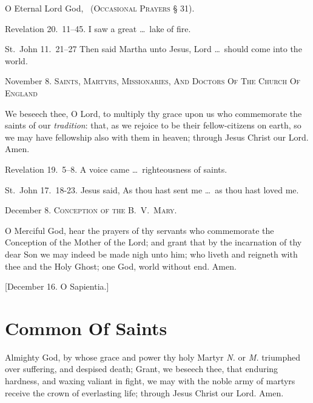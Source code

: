 O Eternal Lord God, \etc\ ({\scshape Occasional Prayers} § 31).

 Revelation 20.~11–45.   I saw a great \ldots\ lake of fire.

 St.~John 11.~21–27   Then said Martha unto Jesus, Lord \ldots\ should come into the world.



 
\medskip

\noindent November 8. {\scshape Saints, Martyrs, Missionaries, And Doctors Of The Church Of England}

 We beseech thee, O Lord, to multiply thy grace upon us who commemorate the saints of our \emph{tradition}: that, as we rejoice to be their fellow-citizens on earth, so we may have fellowship also with them in heaven; through Jesus Christ our Lord. \R Amen.

 Revelation 19.~5–8.   A voice came \ldots\ righteousness of saints.

 St.~John 17.~18-23.   Jesus said, As thou hast sent me \ldots\ as thou hast loved me.

\medskip

\noindent December 8. {\scshape Conception of the B.~V.~Mary.}

 O Merciful God, hear the prayers of thy servants who commemorate the Conception of the Mother of the Lord; and grant that by the incarnation of thy dear Son we may indeed be made nigh unto him; who liveth and reigneth with thee and the Holy Ghost; one God, world without end. Amen.

\medskip

[December 16. O Sapientia.]


 

\section{Common Of Saints}


 Almighty God, by whose grace and power thy holy Martyr \emph{N.} or \emph{M.} triumphed over suffering, and despised death; Grant, we beseech thee, that enduring hardness, and waxing valiant in fight, we may with the noble army of martyrs receive the crown of everlasting life; through Jesus Christ our Lord. \R Amen.

